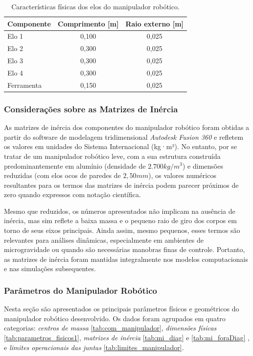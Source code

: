 \begin{table}[H]
\centering
\caption{Características físicas dos elos do manipulador robótico.}
\label{tab:elos_MR}
\begin{tabular}{lcc}
\toprule
Componente & Comprimento [m] & Raio externo [m] \\
\midrule
Elo 1     & 0{,}100   & 0{,}025 \\
Elo 2     & 0{,}300   & 0{,}025 \\
Elo 3     & 0{,}300   & 0{,}025 \\
Elo 4     & 0{,}300   & 0{,}025 \\
Ferramenta & 0{,}150  & 0{,}025 \\
\bottomrule
\end{tabular}
\end{table}

\subsubsection{Considerações sobre as Matrizes de Inércia}

As matrizes de inércia dos componentes do manipulador robótico foram obtidas a partir do software de modelagem tridimensional \emph{Autodesk Fusion 360} e refletem os valores em unidades do Sistema Internacional (kg·m²). No entanto, por se tratar de um manipulador robótico leve, com a sua estrutura construída predominantemente em alumínio (densidade de $2.700kg/m^3$) e dimensões reduzidas (com elos ocos de paredes de $2,50mm$), os valores numéricos resultantes para os termos das matrizes de inércia podem parecer próximos de zero quando expressos com notação científica.

Mesmo que reduzidos, os números apresentados não implicam na ausência de inércia, mas sim reflete a baixa massa e o pequeno raio de giro dos corpos em torno de seus eixos principais. Ainda assim, mesmo pequenos, esses termos são relevantes para análises dinâmicas, especialmente em ambientes de microgravidade ou quando são necessárias manobras finas de controle.
Portanto, as matrizes de inércia foram mantidas integralmente nos modelos computacionais e nas simulações subsequentes.

\subsubsection{Parâmetros do Manipulador Robótico}

Nesta seção são apresentados os principais parâmetros físicos e geométricos do manipulador robótico desenvolvido.  
Os dados foram agrupados em quatro categorias:
\emph{centros de massa} \eqref{tab:com_manipulador},
\emph{dimensões físicas} \eqref{tab:parametros_fisicos1},
\emph{matrizes de inércia} \eqref{tab:mi_diag} e \eqref{tab:mi_foraDiag}
, e
\emph{limites operacionais das juntas} \eqref{tab:limites_manipulador}.  


